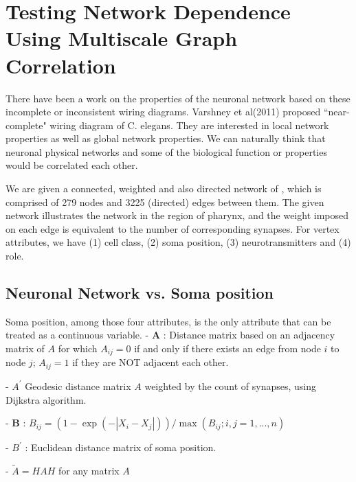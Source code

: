 \documentclass[12pt]{report}
\begin{document}






\doublespace


\chapter{Testing Network Dependence Using Multiscale Graph Correlation} 
\normalsize


There have been a work on the properties of the neuronal network based on these incomplete or inconsistent wiring diagrams. Varshney et al(2011) proposed ``near-complete" wiring diagram of C. elegans. They are interested in local network properties as well as global network properties. We can naturally think that neuronal physical networks and some of the biological function or properties would be correlated each other.

We are given a connected, weighted and also directed network of , which is comprised of 279 nodes and 3225 (directed) edges between them. The given network illustrates the network in the region of pharynx, and the weight imposed on each edge is equivalent to the number of corresponding synapses. For vertex attributes, we have (1) cell class, (2) soma position, (3) neurotransmitters and (4) role. 
 
 
 
 \section{Neuronal Network vs. Soma position}
 
 Soma position, among those four attributes, is the only attribute that can be treated as a continuous variable.
 - $\textbf{A}$ :  Distance matrix based on an adjacency matrix of $A$ for which $A_{ij} = 0$ if and only if there exists an edge from node $i$ to node $j$; $A_{ij} = 1$ if they are NOT adjacent each other. 

- \textbf{$A^\prime$} Geodesic distance matrix $A$ weighted by the count of synapses, using Dijkstra algorithm.
  
- $\textbf{B}$ : $B_{ij} = (1 - \exp(-|X_{i} - X_{j}|)) / \max(B_{ij} ; i,j = 1,...,n)$

- \textbf{$B^\prime$} : Euclidean distance matrix of soma position.

- $\tilde{A} = H A H$ for any matrix $A$
\end{document}
